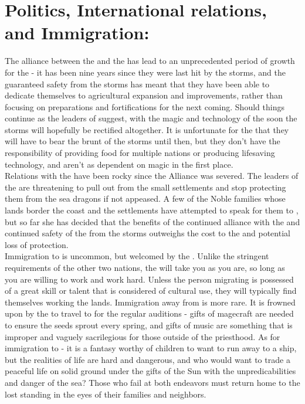 \documentclass[blue]{GL2020}
\begin{document}
\section{Politics, International relations, and Immigration:}

The alliance between the \pSun{} and the \pCreators{} has lead to an unprecedented period of growth for the \pSunCh{} - it has been nine years since they were last hit by the storms, and the guaranteed safety from the storms has meant that they have been able to dedicate themselves to agricultural expansion and improvements, rather than focusing on preparations and fortifications for the next coming.  Should things continue as the leaders of \pCreators{} suggest, with the magic and technology of the \pCreators{} soon the storms will hopefully be rectified altogether.  It is unfortunate for the \pViking{} that they will have to bear the brunt of the storms until then, but they don't have the responsibility of providing food for multiple nations or producing lifesaving technology, and aren't as dependent on magic in the first place.\\

Relations with the \pViking{} have been rocky since the Alliance was severed.  The leaders of the \pViking{} are threatening to pull out from the small settlements and stop protecting them from the sea dragons if not appeased.  A few of the Noble families whose lands border the coast and the \pViking{} settlements have attempted to speak for them to \pQueen{}, but so far she has decided that the benefits of the continued alliance with the \pCreators{} and continued safety of the \pSunCh{} from the storms outweighs the cost to the \pViking{} and potential loss of protection.\\

Immigration to \pSun{} is uncommon, but welcomed by the \pSunCh{}.  Unlike the stringent requirements of the other two nations, the \pSunCh{} will take you as you are, so long as you are willing to work and work hard.  Unless the person migrating is possessed of a great skill or talent that is considered of cultural use, they will typically find themselves working the lands.  Immigration away from \pSun{} is more rare.  It is frowned upon by the \pSunCh{} to travel to \pCreators{} for the regular auditions - gifts of magecraft are needed to ensure the seeds sprout every spring, and gifts of music are something that is improper and vaguely sacrilegious for those outside of the priesthood.  As for immigration to \pViking{} - it is a fantasy worthy of children to want to run away to a \pViking{} ship, but the realities of \pViking{} life are hard and dangerous, and who would want to trade a peaceful life on solid ground under the gifts of the Sun with the unpredicabilities and danger of the sea?  Those who fail at both endeavors must return home to the lost standing in the eyes of their families and neighbors.\\
\end{document}
